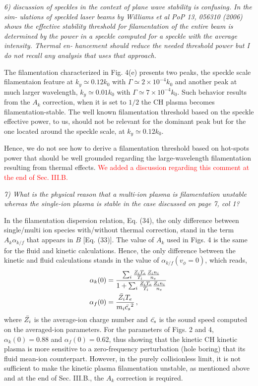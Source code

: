 \documentclass{article}
\def\tc{\textcolor{red}}
\begin{document}
\textit{
6) discussion of speckles in the context of plane wave stability is confusing. In the sim-
ulations of speckled laser beams by Williams et al PoP 13, 056310 (2006) shows the
effective stability threshold for filamentation of the entire beam is determined by the
power in a speckle computed for a speckle with the average intensity. Thermal en-
hancement should reduce the needed threshold power but I do not recall any analysis
that uses that approach.}

The filamentation characterized in Fig. 4(e) presents two peaks, the speckle scale filamentaion feature at $k_y\simeq 0.12k_0$ with $\Gamma \simeq 2\times 10^{-4}k_0$ and another peak at much larger wavelength, $k_y\simeq 0.01k_0$ with $\Gamma \simeq 7\times 10^{-4}k_0$. Such behavior results from the $A_k$ correction, when it is set to $1/2$ the CH plasma becomes filamentation-stable. 
The well known filamentation threshold based on the speckle effective power, to us, should not be relevant for the dominant peak but for the one located around the speckle scale, at $k_y\simeq 0.12k_0$.

Hence, we do not see how to derive a filamentation threshold based on hot-spots power that should be well grounded regarding the large-wavelength filamentation resulting from thermal effects. \tc{We added a discussion regarding this comment at the end of  Sec. III.B.}

\textit{
7)   What is the physical reason that a multi-ion plasma is filamentation unstable whereas
the single-ion plasma is stable in the case discussed on page 7, col 1?}

In the filamentation dispersion relation, Eq. (34), the only difference between single/multi ion species with/without thermal correction, stand in the term $A_k\alpha_{k/f}$ that appears in $B$ [Eq. (33)].  
The value    of $A_k$ used in Figs. 4 is the same for the fluid and kinetic calculations. Hence,  
the only difference between 
the kinetic and fluid calculations stands in the value of $\alpha_{k/f}(v_\phi=0)$, which  reads, 
\begin{align}
    \alpha_k(0)& = 
 \frac{\sum_i\frac{  Z_iT_e}{ T_i }\frac{  Z_in_i}{ n_e }   }{ 1+ \sum_i\frac{  Z_iT_e}{ T_i }\frac{ Z_i n_i}{ n_e }  } \, \\
    \alpha_f(0) &=  \frac{\Bar{Z_i} T_e}{m_i\Bar{c_s}^2} \,,
\end{align}
where $\Bar{Z_i} $ is the average-ion charge number and $\Bar{c_s}$ is the sound speed computed on the averaged-ion parameters. For the parameters of Figs. 2 and 4, $\alpha_k(0)=0.88$ and $\alpha_f(0)= 0.62$, thus showing that the kinetic CH kinetic plasma is more sensitive to a zero-frequency perturbation (hole boring) that its fluid mean-ion counterpart.  However, in the purely collisionless limit, it is not sufficient to make the kinetic plasma filamentation unstable, as mentioned above and at the end of Sec. III.B., the $A_k$ correction is required. 
\end{document}
